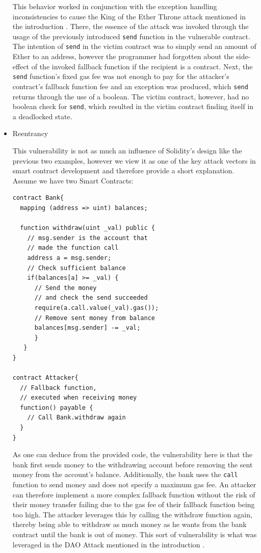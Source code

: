 \documentclass[letterpaper,twocolumn,10pt]{article}
\begin{document}
\begin{itemize}
  This behavior worked in conjunction with the exception handling inconsistencies to cause the King of the Ether Throne attack mentioned in the introduction \cite{atzei_bartoletti_cimoli_2017}. There, the essence of the attack was invoked through the usage of the previously introduced \verb|send| function in the vulnerable contract. The intention of \verb|send| in the victim contract was to simply send an amount of Ether to an address, however the programmer had forgotten about the side-effect of the invoked fallback function if the recipient is a contract. Next, the \verb|send| function's fixed gas fee was not enough to pay for the attacker's contract's fallback function fee and an exception was produced, which \verb|send| returns through the use of a boolean. The victim contract, however, had no boolean check for \verb|send|, which resulted in the victim contract finding itself in a deadlocked state.
  
    \item Reentrancy
    
    
    This vulnerability is not as much an influence of Solidity's design like the previous two examples, however we view it as one of the key attack vectors in smart contract development and therefore provide a short explanation. Assume we have two Smart Contracts:
    
  \begin{verbatim}
contract Bank{  
  mapping (address => uint) balances;

  function withdraw(uint _val) public {
    // msg.sender is the account that  
    // made the function call
    address a = msg.sender;
    // Check sufficient balance
    if(balances[a] >= _val) {
      // Send the money 
      // and check the send succeeded
      require(a.call.value(_val).gas());
      // Remove sent money from balance
      balances[msg.sender] -= _val;
      }
   }
}  

contract Attacker{
  // Fallback function,
  // executed when receiving money
  function() payable { 
    // Call Bank.withdraw again    
  }
}
  \end{verbatim}
  
As one can deduce from the provided code, the vulnerability here is that the bank first sends money to the withdrawing account before removing the sent money from the account's balance. Additionally, the bank uses the \verb|call| function to send money and does not specify a maximum gas fee. An attacker can therefore implement a more complex fallback function without the risk of their money transfer failing due to the gas fee of their fallback function being too high. The attacker leverages this by calling the withdraw function again, thereby being able to withdraw as much money as he wants from the bank contract until the bank is out of money. This sort of vulnerability is what was leveraged in the DAO Attack mentioned in the introduction \cite{atzei_bartoletti_cimoli_2017}. 


\end{itemize}
\end{document}
